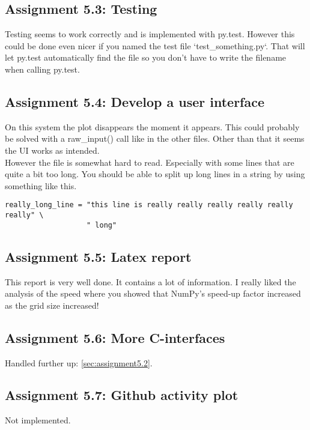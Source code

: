 \documentclass[a4paper]{article}
\begin{document}
\subsection*{Assignment 5.3: Testing}
Testing seems to work correctly and is implemented with py.test. However this could be done even nicer if you named the test file `test\_something.py`. That will let py.test automatically find the file so you don't have to write the filename when calling py.test.


\subsection*{Assignment 5.4:  Develop a user interface}
On this system the plot disappears the moment it appears. This could probably be solved with a raw\_input() call like in the other files.
Other than that it seems the UI works as intended.\\
\indent However the file is somewhat hard to read. Especially with some lines that are quite a bit too long. You should be able to split up long lines in a string by using something like this.

\begin{verbatim}
really_long_line = "this line is really really really really really really" \
                   " long"
\end{verbatim}


\subsection*{Assignment 5.5: Latex report}
This report is very well done. It contains a lot of information. I really liked the analysis of the speed where you showed that NumPy's speed-up factor increased as the grid size increased!

\subsection*{Assignment 5.6: More C-interfaces}
Handled further up: \ref{sec:assignment5.2}.

\subsection*{Assignment 5.7: Github activity plot}
Not implemented.



\end{document}
